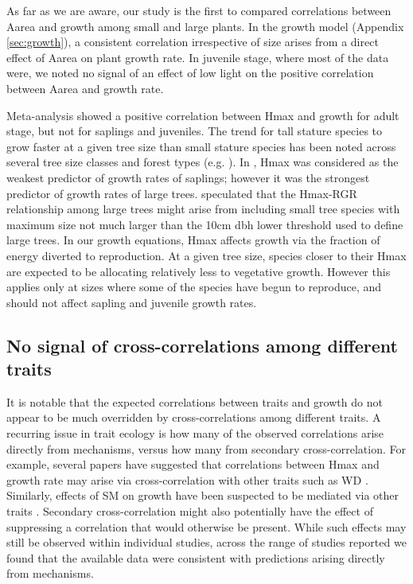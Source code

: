 \documentclass[a4paper]{article}\usepackage[]{graphicx}\usepackage[]{color}
\begin{document}
As far as we are aware, our study is the first to compared correlations between Aarea and growth among small and large plants. In the growth model (Appendix \ref{sec:growth}), a consistent correlation irrespective of size arises from a direct effect of Aarea on plant growth rate. In juvenile stage, where most of the data were, we noted no signal of an effect of low light on the positive correlation between Aarea and growth rate.

Meta-analysis showed a positive correlation between Hmax and growth for adult stage, but not for saplings and juveniles. The trend for tall stature species to grow faster at a given tree size than small stature species has been noted across several tree size classes and forest types (e.g. \citealt{Poorter:2008iu,Wright:2010tp,Herault:2011dd,Ruger:2012jv,Iida:2014ep}). In \citet{Wright:2010tp}, Hmax was considered as the weakest predictor of growth rates of saplings; however it was the strongest predictor of growth rates of large trees. \citet{Poorter:2008iu} speculated that the Hmax-RGR relationship among large trees might arise from including small tree species with maximum size not much larger than the  10cm dbh lower threshold used to define large trees. In our growth equations, Hmax affects growth via the fraction of energy diverted to reproduction. At a given tree size, species closer to their Hmax are expected to be allocating relatively less to vegetative growth. However this applies only at sizes where some of the species have begun to reproduce, and should not affect sapling and juvenile growth rates.

\subsection*{No signal of cross-correlations among different traits}

It is notable that the expected correlations between traits and growth do not appear to be much overridden by cross-correlations among different traits. A recurring issue in trait ecology is how many of the observed correlations arise directly from mechanisms, versus how many from secondary cross-correlation. For example, several papers have suggested that correlations between Hmax and growth rate may arise via cross-correlation with other traits such as WD \citep{Thomas:1996do, Poorter:2006vb, Wright:2010tp}. Similarly, effects of SM on growth have been suspected to be mediated via other traits \citep{Shipley:1990js,Westoby:2002ft,Poorter:2006vb}. Secondary cross-correlation might also potentially have the effect of suppressing a correlation that would otherwise be present. While such effects may still be observed within individual studies, across the range of studies reported we found that the available data were consistent with predictions arising directly from mechanisms.
\end{document}
